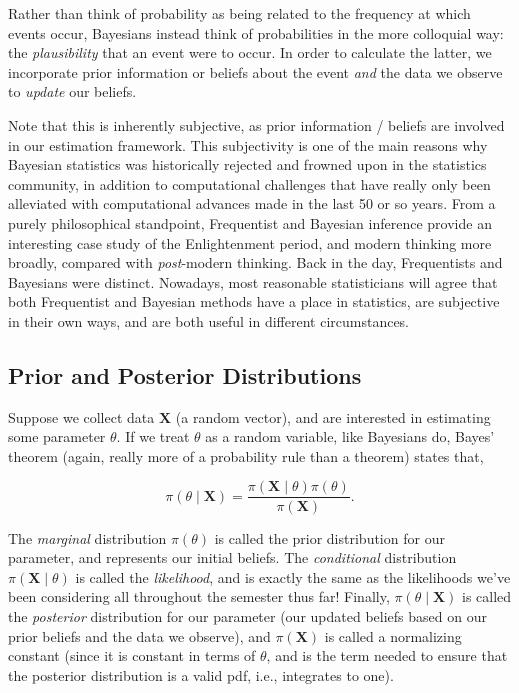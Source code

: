 \documentclass[
  letterpaper,
  DIV=11,
  numbers=noendperiod]{scrreprt}
\begin{document}
Rather than think of probability as being related to the frequency at
which events occur, Bayesians instead think of probabilities in the more
colloquial way: the \emph{plausibility} that an event were to occur. In
order to calculate the latter, we incorporate prior information or
beliefs about the event \emph{and} the data we observe to \emph{update}
our beliefs.

Note that this is inherently subjective, as prior information / beliefs
are involved in our estimation framework. This subjectivity is one of
the main reasons why Bayesian statistics was historically rejected and
frowned upon in the statistics community, in addition to computational
challenges that have really only been alleviated with computational
advances made in the last 50 or so years. From a purely philosophical
standpoint, Frequentist and Bayesian inference provide an interesting
case study of the Enlightenment period, and modern thinking more
broadly, compared with \emph{post}-modern thinking. Back in the day,
Frequentists and Bayesians were distinct. Nowadays, most reasonable
statisticians will agree that both Frequentist and Bayesian methods have
a place in statistics, are subjective in their own ways, and are both
useful in different circumstances.

\subsection*{Prior and Posterior
Distributions}\label{prior-and-posterior-distributions}

Suppose we collect data \(\textbf{X}\) (a random vector), and are
interested in estimating some parameter \(\theta\). If we treat
\(\theta\) as a random variable, like Bayesians do, Bayes' theorem
(again, really more of a probability rule than a theorem) states that,

\[
\pi(\theta \mid \textbf{X}) = \frac{\pi(\textbf{X} \mid \theta)\pi(\theta)}{\pi(\textbf{X})}.
\]

The \emph{marginal} distribution \(\pi(\theta)\) is called the prior
distribution for our parameter, and represents our initial beliefs. The
\emph{conditional} distribution \(\pi(\textbf{X} \mid \theta)\) is
called the \emph{likelihood}, and is exactly the same as the likelihoods
we've been considering all throughout the semester thus far! Finally,
\(\pi(\theta \mid \textbf{X})\) is called the \emph{posterior}
distribution for our parameter (our updated beliefs based on our prior
beliefs and the data we observe), and \(\pi(\textbf{X})\) is called a
normalizing constant (since it is constant in terms of \(\theta\), and
is the term needed to ensure that the posterior distribution is a valid
pdf, i.e., integrates to one).
\end{document}
